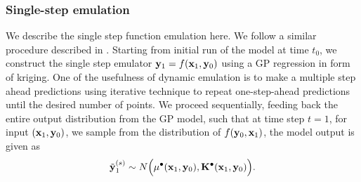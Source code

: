 \subsubsection{Single-step emulation}
We describe the single step function emulation here. We follow a similar procedure described in \citet{pd12,pd15}. Starting from initial run of the model at time $t_0$, we construct the single step emulator ${\bf y}_1 = f({\bf x}_1, {\bf y}_{0})$ using a GP regression in form of kriging. One of the usefulness of dynamic emulation is to make a multiple step ahead predictions using iterative technique to repeat one-step-ahead predictions until the desired number of points. We proceed sequentially, feeding back the entire output distribution from the GP model, such that at time step $t=1$, for input $({\bf x}_1,{\bf y}_0)$, we sample from the distribution of $f({\bf y}_0,{\bf x}_1)$, the model output is given as $${\tilde {\bf y}}^{(s)}_1 \sim N \Big(\mu^{\bullet}({\bf x}_1,{\bf y}_0), {\mathbf{K}}^{\bullet}({\bf x}_1,{\bf y}_0)\Big).$$


